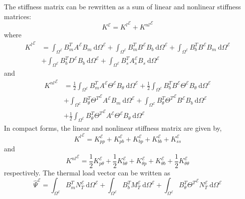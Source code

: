 \documentclass[12pt]{article}
\numberwithin{equation}{section}
\def\el{{ \mathcal{E} }}
\begin{document}
The stiffness matrix can be rewritten as a sum of linear and nonlinear stiffness matrices:
% 
\begin{equation}
    K^\el = {K^l}^\el + {K^{nl}}^\el
\end{equation}
% 
where
% 
\begin{equation}
    \begin{aligned}
        {K^l}^\el & =
        \int_{\Omega^\el} B_m^T A^\el B_m ~ \text{d}\Omega^\el +
        \int_{\Omega^\el} B_m^T B^\el B_b ~ \text{d}\Omega^\el +
        \int_{\Omega^\el} B_b^T B^\el B_m ~ \text{d}\Omega^\el \\
                  & +
        \int_{\Omega^\el} B_b^T D^\el B_b ~ \text{d}\Omega^\el +
        \int_{\Omega^\el} B_s^T A_s^\el B_s ~ \text{d}\Omega^\el
    \end{aligned}
\end{equation}
% 
and
% 
\begin{equation}
    \begin{aligned}
        {K^{nl}}^\el & =
        \frac{1}{2} \int_{\Omega^\el} B_m^T A^\el \Theta^\el B_\theta ~ \text{d}\Omega^\el +
        \frac{1}{2} \int_{\Omega^\el} B_b^T B^\el \Theta^\el B_\theta ~ \text{d}\Omega^\el \\
                     & +
        \int_{\Omega^\el} B_\theta^T {\Theta^T}^\el A^\el B_m ~ \text{d}\Omega^\el +
        \int_{\Omega^\el} B_\theta^T {\Theta^T}^\el B^\el B_b ~ \text{d}\Omega^\el         \\
                     & +
        \frac{1}{2} \int_{\Omega^\el} B_\theta^T {\Theta^T}^\el A^\el \Theta^\el B_\theta ~ \text{d}\Omega^\el
    \end{aligned}
\end{equation}
% 
In compact forms, the linear and nonlinear stiffness matrix are given by,
% 
\begin{equation}
    {K^l}^\el =
    K_{pp}^\el +
    K_{pb}^\el +
    K_{bp}^\el +
    K_{bb}^\el +
    K_{ss}^\el
\end{equation}
% 
and
% 
\begin{equation}
    {K^{nl}}^\el =
    \frac{1}{2} K_{p \theta}^\el +
    \frac{1}{2} K_{b \theta}^\el +
    K_{\theta p}^\el +
    K_{\theta b}^\el +
    \frac{1}{2} K_{\theta \theta}^\el
\end{equation}
% 
respectively. The thermal load vector can be written as
% 
\begin{equation}
    \hat{\Psi}^\el =
    \int_{\Omega^\el} B_m^T N_T^\el ~ \text{d}\Omega^\el +
    \int_{\Omega^\el} B_b^T M_T^\el ~ \text{d}\Omega^\el +
    \int_{\Omega^\el} B_\theta^T {\Theta^T}^\el  N_T^\el ~ \text{d}\Omega^\el
    \label{eq:element_thermal_load}
\end{equation}
\end{document}
